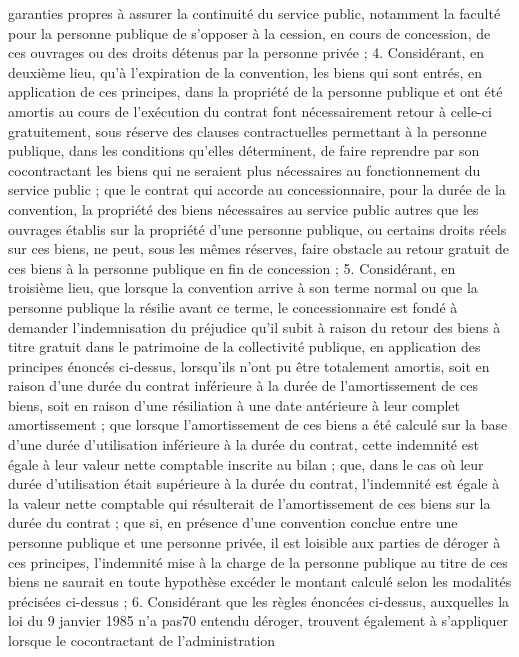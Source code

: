 \documentclass[11pt,a4paper]{report}
\begin{document}
garanties propres à assurer la continuité du service public, notamment la faculté pour la personne
publique de s'opposer à la cession, en cours de concession, de ces ouvrages ou des droits détenus
par la personne privée ;
4. Considérant, en deuxième lieu, qu'à l'expiration de la convention, les biens qui sont entrés, en
application de ces principes, dans la propriété de la personne publique et ont été amortis au cours
de l'exécution du contrat font nécessairement retour à celle-ci gratuitement, sous réserve des
clauses contractuelles permettant à la personne publique, dans les conditions qu'elles déterminent,
de faire reprendre par son cocontractant les biens qui ne seraient plus nécessaires au
fonctionnement du service public ; que le contrat qui accorde au concessionnaire, pour la durée de
la convention, la propriété des biens nécessaires au service public autres que les ouvrages établis
sur la propriété d'une personne publique, ou certains droits réels sur ces biens, ne peut, sous les
mêmes réserves, faire obstacle au retour gratuit de ces biens à la personne publique en fin de
concession ;
5. Considérant, en troisième lieu, que lorsque la convention arrive à son terme normal ou que la
personne publique la résilie avant ce terme, le concessionnaire est fondé à demander
l'indemnisation du préjudice qu'il subit à raison du retour des biens à titre gratuit dans le
patrimoine de la collectivité publique, en application des principes énoncés ci-dessus, lorsqu'ils
n'ont pu être totalement amortis, soit en raison d'une durée du contrat inférieure à la durée de
l'amortissement de ces biens, soit en raison d'une résiliation à une date antérieure à leur complet
amortissement ; que lorsque l'amortissement de ces biens a été calculé sur la base d'une durée
d'utilisation inférieure à la durée du contrat, cette indemnité est égale à leur valeur nette
comptable inscrite au bilan ; que, dans le cas où leur durée d'utilisation était supérieure à la durée
du contrat, l'indemnité est égale à la valeur nette comptable qui résulterait de l'amortissement de
ces biens sur la durée du contrat ; que si, en présence d'une convention conclue entre une personne
publique et une personne privée, il est loisible aux parties de déroger à ces principes, l'indemnité
mise à la charge de la personne publique au titre de ces biens ne saurait en toute hypothèse
excéder le montant calculé selon les modalités précisées ci-dessus ;
6. Considérant que les règles énoncées ci-dessus, auxquelles la loi du 9 janvier 1985 n'a pas70
entendu déroger, trouvent également à s'appliquer lorsque le cocontractant de l'administration
\end{document}
